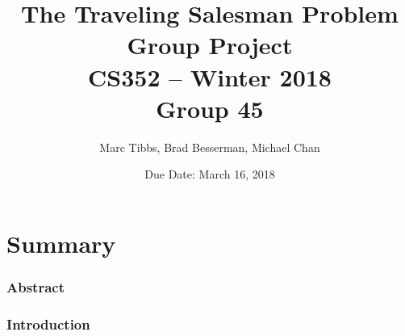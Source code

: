 \documentclass{article}
\title{The Traveling Salesman Problem Group Project\\[.25cm] CS352 – Winter 2018\\[.5cm]Group 45}
\author{Marc Tibbs, Brad Besserman, Michael Chan}
\date{Due Date: March 16, 2018}
\begin{document}
\maketitle

\part*{Summary}

\section{Abstract}

\section{Introduction}

\newpage




\end{document}
